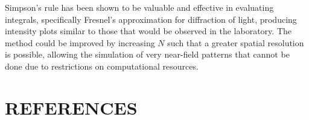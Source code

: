 \documentclass[twocolumn,prl,nobalancelastpage,aps,10pt]{revtex4-1}
\begin{document}
Simpson's rule has been shown to be valuable and effective in evaluating integrals, specifically Fresnel's approximation for diffraction of light, producing intensity plots similar to those that would be observed in the laboratory. The method could be improved by increasing $N$ such that a greater spatial resolution is possible, allowing the simulation of very near-field patterns that cannot be done due to restrictions on computational resources.

\section{REFERENCES}



\end{document}
